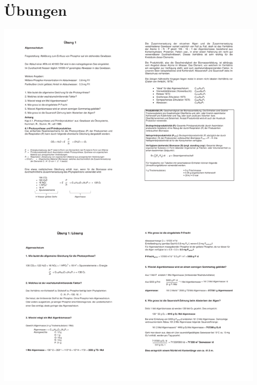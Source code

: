 \documentclass[9pt, openright=false]{scrartcl}
\begin{document}
\section{Übungen}
\begin{center}
\includegraphics[width=.95\textwidth]{images/uebung1}
\end{center} 
\end{document}
